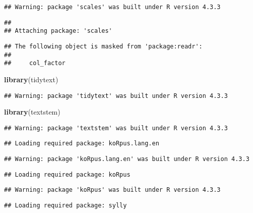 \documentclass[
]{article}
\newenvironment{Shaded}{\begin{snugshade}}{\end{snugshade}}
\newcommand{\FunctionTok}[1]{\textcolor[rgb]{0.13,0.29,0.53}{\textbf{#1}}}
\newcommand{\NormalTok}[1]{#1}
\begin{document}
\begin{verbatim}
## Warning: package 'scales' was built under R version 4.3.3
\end{verbatim}

\begin{verbatim}
## 
## Attaching package: 'scales'
\end{verbatim}

\begin{verbatim}
## The following object is masked from 'package:readr':
## 
##     col_factor
\end{verbatim}

\begin{Shaded}
\begin{Highlighting}[]
\FunctionTok{library}\NormalTok{(tidytext)}
\end{Highlighting}
\end{Shaded}

\begin{verbatim}
## Warning: package 'tidytext' was built under R version 4.3.3
\end{verbatim}

\begin{Shaded}
\begin{Highlighting}[]
\FunctionTok{library}\NormalTok{(textstem)}
\end{Highlighting}
\end{Shaded}

\begin{verbatim}
## Warning: package 'textstem' was built under R version 4.3.3
\end{verbatim}

\begin{verbatim}
## Loading required package: koRpus.lang.en
\end{verbatim}

\begin{verbatim}
## Warning: package 'koRpus.lang.en' was built under R version 4.3.3
\end{verbatim}

\begin{verbatim}
## Loading required package: koRpus
\end{verbatim}

\begin{verbatim}
## Warning: package 'koRpus' was built under R version 4.3.3
\end{verbatim}

\begin{verbatim}
## Loading required package: sylly
\end{verbatim}
\end{document}
